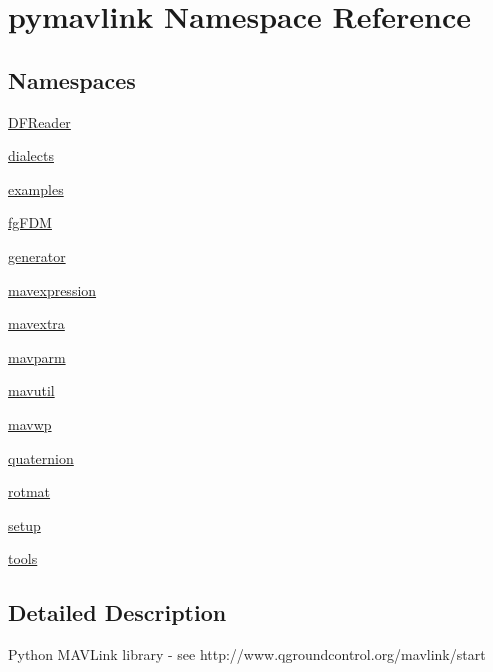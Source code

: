 \hypertarget{namespacepymavlink}{}\section{pymavlink Namespace Reference}
\label{namespacepymavlink}
\subsection*{Namespaces}
\begin{DoxyCompactItemize}
\item 
 \mbox{\hyperlink{namespacepymavlink_1_1DFReader}{D\+F\+Reader}}
\item 
 \mbox{\hyperlink{namespacepymavlink_1_1dialects}{dialects}}
\item 
 \mbox{\hyperlink{namespacepymavlink_1_1examples}{examples}}
\item 
 \mbox{\hyperlink{namespacepymavlink_1_1fgFDM}{fg\+F\+DM}}
\item 
 \mbox{\hyperlink{namespacepymavlink_1_1generator}{generator}}
\item 
 \mbox{\hyperlink{namespacepymavlink_1_1mavexpression}{mavexpression}}
\item 
 \mbox{\hyperlink{namespacepymavlink_1_1mavextra}{mavextra}}
\item 
 \mbox{\hyperlink{namespacepymavlink_1_1mavparm}{mavparm}}
\item 
 \mbox{\hyperlink{namespacepymavlink_1_1mavutil}{mavutil}}
\item 
 \mbox{\hyperlink{namespacepymavlink_1_1mavwp}{mavwp}}
\item 
 \mbox{\hyperlink{namespacepymavlink_1_1quaternion}{quaternion}}
\item 
 \mbox{\hyperlink{namespacepymavlink_1_1rotmat}{rotmat}}
\item 
 \mbox{\hyperlink{namespacepymavlink_1_1setup}{setup}}
\item 
 \mbox{\hyperlink{namespacepymavlink_1_1tools}{tools}}
\end{DoxyCompactItemize}


\subsection{Detailed Description}
\begin{DoxyVerb}Python MAVLink library - see http://www.qgroundcontrol.org/mavlink/start\end{DoxyVerb}
 